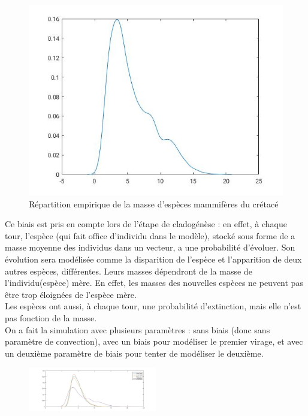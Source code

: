 \documentclass[fleqn,10pt]{SelfArx}
\begin{document}
\begin{figure}[H]
\centering
\includegraphics[width =5 cm]{empirique.jpg}
\caption{ Répartition empirique de la masse d'espèces mammifères du crétacé}
\end{figure}

Ce biais est pris en compte lors de l'étape de cladogénèse : en effet, à chaque tour, l'espèce (qui fait office d'individu dans le modèle), stocké sous forme de a masse moyenne des individus dans un vecteur, a une probabilité d'évoluer. Son évolution sera modélisée comme la disparition de l'espèce et l'apparition de deux autres espèces, différentes. Leurs masses dépendront de la masse de l'individu(espèce) mère. En effet, les masses des nouvelles espèces ne peuvent pas être trop éloignées de l'espèce mère.
\\Les espèces ont aussi, à chaque tour, une probabilité d'extinction, mais elle n'est pas fonction de la masse.
\\On a fait la simulation avec plusieurs paramètres : sans biais (donc sans paramètre de convection), avec un biais pour modéliser le premier virage, et avec un deuxième paramètre de biais pour tenter de modéliser le deuxième.

\begin{figure}[H]
\centering
    \includegraphics[width =0.5\textwidth]{comparaisongraphes.jpg}

\end{figure}
\end{document}
